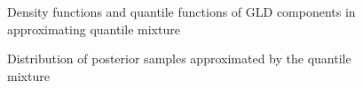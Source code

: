 \documentclass[
]{interact}
\begin{document}
\begin{figure}


\caption{\label{fig-gld-comp}Density functions and quantile functions of
GLD components in approximating quantile mixture}

\end{figure}%

\begin{figure}


\caption{\label{fig-fitted-qm}Distribution of posterior samples
approximated by the quantile mixture}

\end{figure}%
\end{document}

